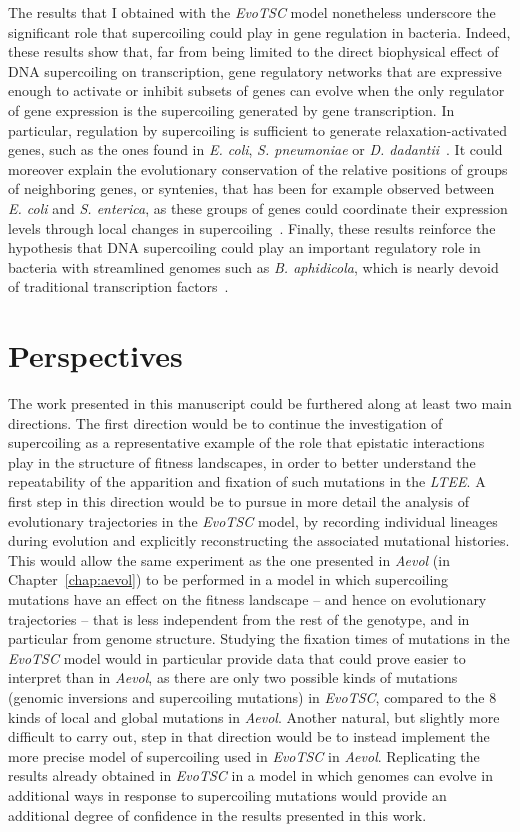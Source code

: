The results that I obtained with the \emph{EvoTSC} model nonetheless underscore the significant role that supercoiling could play in gene regulation in bacteria.
Indeed, these results show that, far from being limited to the direct biophysical effect of DNA supercoiling on transcription, gene regulatory networks that are expressive enough to activate or inhibit subsets of genes can evolve when the only regulator of gene expression is the supercoiling generated by gene transcription.
In particular, regulation by supercoiling is sufficient to generate relaxation-activated genes, such as the ones found in \emph{E. coli}, \emph{S. pneumoniae} or \emph{D. dadantii}~\citep{peter2004,ferrandiz2010,pineau2022a}.
It could moreover explain the evolutionary conservation of the relative positions of groups of neighboring genes, or syntenies, that has been for example observed between \emph{E. coli} and \emph{S. enterica}, as these groups of genes could coordinate their expression levels through local changes in supercoiling~\citep{junier2016}.
Finally, these results reinforce the hypothesis that DNA supercoiling could play an important regulatory role in bacteria with streamlined genomes such as \emph{B. aphidicola}, which is nearly devoid of traditional transcription factors~\citep{brinza2013}.


\section{Perspectives}

The work presented in this manuscript could be furthered along at least two main directions.
The first direction would be to continue the investigation of supercoiling as a representative example of the role that epistatic interactions play in the structure of fitness landscapes, in order to better understand the repeatability of the apparition and fixation of such mutations in the \emph{LTEE}.
A first step in this direction would be to pursue in more detail the analysis of evolutionary trajectories in the \emph{EvoTSC} model, by recording individual lineages during evolution and explicitly reconstructing the associated mutational histories.
This would allow the same experiment as the one presented in \emph{Aevol} (in Chapter~\ref{chap:aevol}) to be performed in a model in which supercoiling mutations have an effect on the fitness landscape -- and hence on evolutionary trajectories -- that is less independent from the rest of the genotype, and in particular from genome structure.
Studying the fixation times of mutations in the \emph{EvoTSC} model would in particular provide data that could prove easier to interpret than in \emph{Aevol}, as there are only two possible kinds of mutations (genomic inversions and supercoiling mutations) in \emph{EvoTSC}, compared to the 8 kinds of local and global mutations in \emph{Aevol}.
Another natural, but slightly more difficult to carry out, step in that direction would be to instead implement the more precise model of supercoiling used in \emph{EvoTSC} in \emph{Aevol}.
Replicating the results already obtained in \emph{EvoTSC} in a model in which genomes can evolve in additional ways in response to supercoiling mutations would provide an additional degree of confidence in the results presented in this work.

